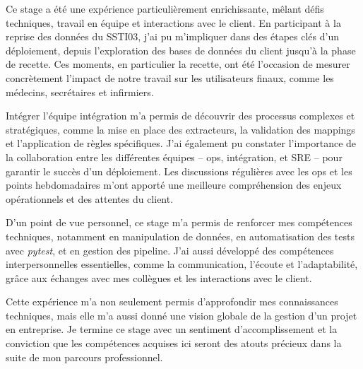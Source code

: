 

Ce stage a été une expérience particulièrement enrichissante, mêlant défis techniques, travail en équipe et interactions avec le client. En participant à la reprise des données du SSTI03, j’ai pu m’impliquer dans des étapes clés d’un déploiement, depuis l’exploration des bases de données du client jusqu’à la phase de recette. Ces moments, en particulier la recette, ont été l’occasion de mesurer concrètement l’impact de notre travail sur les utilisateurs finaux, comme les médecins, secrétaires et infirmiers.

Intégrer l’équipe intégration m’a permis de découvrir des processus complexes et stratégiques, comme la mise en place des extracteurs, la validation des mappings et l’application de règles spécifiques. J’ai également pu constater l’importance de la collaboration entre les différentes équipes – ops, intégration, et SRE – pour garantir le succès d’un déploiement. Les discussions régulières avec les ops et les points hebdomadaires m’ont apporté une meilleure compréhension des enjeux opérationnels et des attentes du client.

D’un point de vue personnel, ce stage m’a permis de renforcer mes compétences techniques, notamment en manipulation de données, en automatisation des tests avec \textit{pytest}, et en gestion des pipeline. J’ai aussi développé des compétences interpersonnelles essentielles, comme la communication, l’écoute et l’adaptabilité, grâce aux échanges avec mes collègues et les interactions avec le client.

Cette expérience m’a non seulement permis d’approfondir mes connaissances techniques, mais elle m’a aussi donné une vision globale de la gestion d’un projet en entreprise. Je termine ce stage avec un sentiment d’accomplissement et la conviction que les compétences acquises ici seront des atouts précieux dans la suite de mon parcours professionnel.


